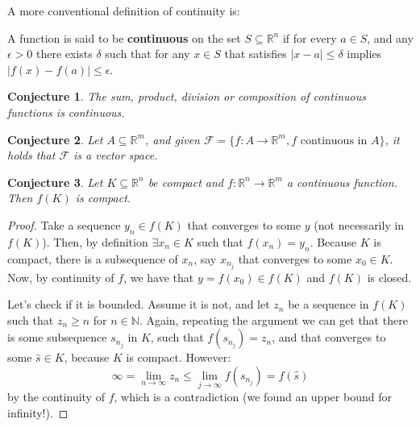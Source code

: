 \documentclass[aspectratio=169, handout]{beamer}
\newtheorem{proposition}{Conjecture}[section]
\begin{document}
\begin{frame}
    
    A more conventional definition of continuity is:
    
    \begin{definition}
     A function is said to be \textbf{continuous} on the set $S\subseteq\mathds{R}^n$ if for every $a\in S$, and any $\epsilon>0$ there exists $\delta$ such that for any $x\in S$ that satisfies $|x-a|\leq \delta$ implies $|f(x)-f(a)|\leq \epsilon$.
    \end{definition}
    
    
\end{frame}

\begin{frame}

    \begin{proposition}
        The sum, product, division or composition of continuous functions is continuous.
    \end{proposition}

    \begin{proposition}
        Let $A\subseteq\mathds{R}^m$, and given $\mathcal{F}=\{f:A\rightarrow\mathds{R}^m, f \text{ continuous in } A\}$, it holds that $\mathcal{F}$ is a vector space.
    \end{proposition}
\end{frame}

\begin{frame}
    \begin{proposition}
        Let $K\subseteq\mathds{R}^n$ be compact and $f:\mathds{R}^n\rightarrow\mathds{R}^m$ a continuous function. Then $f(K)$ is compact.
    \end{proposition}
\end{frame}

\begin{frame}
    \begin{proof}
        Take a sequence $y_n\in f(K)$ that converges to some $y$ (not necessarily in $f(K)$). Then, by definition $\exists x_n\in K$ such that $f(x_n)=y_n$. Because $K$ is compact,
        there is a subsequence of $x_n$, say $x_{n_j}$ that converges to some $x_0\in K$. Now, by continuity of $f$, we have that $y=f(x_0)\in f(K)$ and $f(K)$ is closed.

        \vspace{0.5em}

        Let's check if it is bounded. Assume it is not, and let $z_n$ be a sequence in $f(K)$ such that $z_n\geq n$ for $n\in\mathds{N}$. Again, repeating the argument we can get that there is some
        subsequence $s_{n_j}$ in $K$, such that $f(s_{n_j})=z_n$, and that converges to some $\hat{s}\in K$, because $K$ is compact. However:
        \[\infty = \lim_{n\rightarrow\infty}z_n\leq \lim_{j\rightarrow\infty} f(s_{n_j})=f(\hat{s})\]
        by the continuity of $f$, which is a contradiction (we found an upper bound for infinity!).
    \end{proof}
\end{frame}
\end{document}
